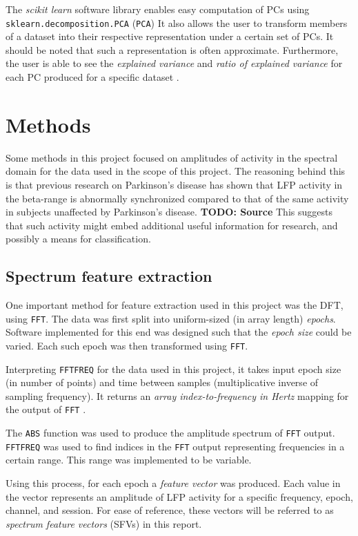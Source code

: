 \documentclass{article}
\begin{document}
The \textit{scikit learn} software library enables easy computation of PCs using \texttt{sklearn.decomposition.PCA} (\texttt{PCA})
It also allows the user to transform members of a dataset into their respective representation under a certain set of PCs. 
It should be noted that such a representation is often approximate.
Furthermore, the user is able to see the \textit{explained variance} and \textit{ratio of explained variance} for each PC produced for a specific dataset \citep{SKLEARN}.

\newpage
\section{Methods}
Some methods in this project focused on amplitudes of activity in the spectral domain for the data used in the scope of this project.
The reasoning behind this is that previous research on Parkinson's disease has shown that LFP activity in the beta-range is abnormally synchronized compared to that of the same activity in subjects unaffected by Parkinson's disease. \textbf{TODO: Source}
This suggests that such activity might embed additional useful information for research, and possibly a means for classification. 

\subsection{Spectrum feature extraction}
One important method for feature extraction used in this project was the DFT, using \texttt{FFT}. 
The data was first split into uniform-sized (in array length) \textit{epochs}.
Software implemented for this end was designed such that the \textit{epoch size} could be varied.
Each such epoch was then transformed using \texttt{FFT}.

Interpreting \texttt{FFTFREQ} for the data used in this project, it takes input epoch size (in number of points) and time between samples (multiplicative inverse of sampling frequency). 
It returns an \textit{array index-to-frequency in Hertz} mapping for the output of \texttt{FFT} \citep{numpy}.

The \texttt{ABS} function was used to produce the amplitude spectrum of \texttt{FFT} output. 
\texttt{FFTFREQ} was used to find indices in the \texttt{FFT} output representing frequencies in a certain range.
This range was implemented to be variable.

Using this process, for each epoch a \textit{feature vector} was produced. 
Each value in the vector represents an amplitude of LFP activity for a specific frequency, epoch, channel, and session.
For ease of reference, these vectors will be referred to as \textit{spectrum feature vectors} (SFVs) in this report.
\end{document}
